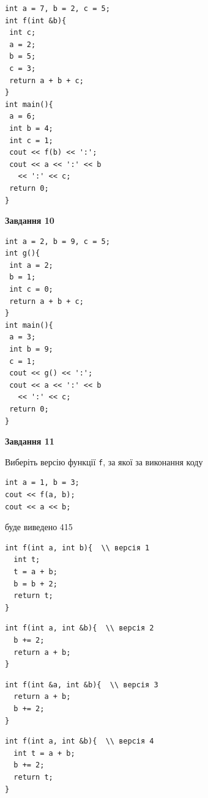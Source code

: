 \documentclass[12pt, ukrainian]{article}
\def\code#1{\Verb!#1!}
\begin{document}
{\begin {large}
\begin{minipage}[t]{7.0cm}
\begin{verbatim}
int a = 7, b = 2, c = 5;
int f(int &b){
 int c;
 a = 2;
 b = 5;
 c = 3;
 return a + b + c;
}
int main(){
 a = 6;
 int b = 4;
 int c = 1;
 cout << f(b) << ':';
 cout << a << ':' << b 
   << ':' << c;
 return 0;
}
\end{verbatim}



\begin{center}
\textbf{Завдання 10}
\end{center}
\vspace{-8mm}

\begin{verbatim}
int a = 2, b = 9, c = 5;
int g(){
 int a = 2;
 b = 1;
 int c = 0;
 return a + b + c;
}
int main(){
 a = 3;
 int b = 9;
 c = 1;
 cout << g() << ':';
 cout << a << ':' << b 
   << ':' << c;
 return 0;
}
\end{verbatim}

\end{minipage}
\vline \hspace{1mm}
\begin{minipage}[t]{11.0cm}

\begin{center}
\textbf{Завдання 11}
\end{center}
Виберіть версію функції \code{f}, за якої за виконання коду
\begin{verbatim}
int a = 1, b = 3;
cout << f(a, b);
cout << a << b;
\end{verbatim}

буде виведено 415

\begin{verbatim}
int f(int a, int b){  \\ версія 1
  int t;
  t = a + b;
  b = b + 2;
  return t;
}
\end{verbatim}

\vspace{-8mm}\begin{verbatim}
int f(int a, int &b){  \\ версія 2
  b += 2;
  return a + b;
}
\end{verbatim}

\vspace{-8mm}\begin{verbatim}
int f(int &a, int &b){  \\ версія 3
  return a + b;
  b += 2;
}
\end{verbatim}

\vspace{-8mm}\begin{verbatim}
int f(int a, int &b){  \\ версія 4
  int t = a + b;
  b += 2;
  return t;
}
\end{verbatim}




\end{minipage}
\end{large}}
\end{document}
